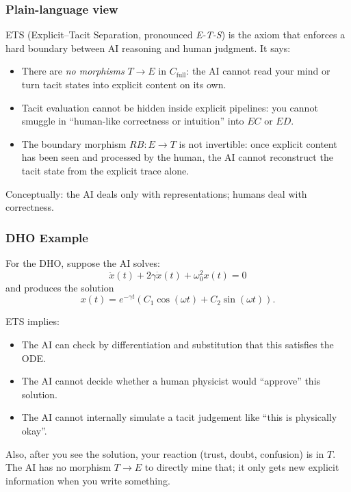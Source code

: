 \subsubsection*{Plain-language view}

ETS (Explicit--Tacit Separation, pronounced \emph{E-T-S}) is the axiom that enforces a hard boundary
between AI reasoning and human judgment. It says:

\begin{itemize}
 \item There are \emph{no morphisms} $T \to E$ in $C_{\text{full}}$:
 the AI cannot read your mind or turn tacit states into explicit content on its own.
 \item Tacit evaluation cannot be hidden inside explicit pipelines:
 you cannot smuggle in ``human-like correctness or intuition'' into $EC$ or $ED$.
 \item The boundary morphism $RB : E \to T$ is not invertible:
 once explicit content has been seen and processed by the human, the AI cannot reconstruct
 the tacit state from the explicit trace alone.
\end{itemize}

Conceptually: the AI deals only with representations; humans deal with correctness.

\subsubsection*{DHO Example}

For the DHO, suppose the AI solves:
\[
\ddot{x}(t) + 2\gamma \dot{x}(t) + \omega_0^2 x(t) = 0
\]
and produces the solution
\[
x(t) = e^{-\gamma t}(C_1 \cos(\omega t) + C_2 \sin(\omega t)).
\]

ETS implies:

\begin{itemize}
 \item The AI can check by differentiation and substitution that this satisfies the ODE.
 \item The AI cannot decide whether a human physicist would ``approve'' this solution.
 \item The AI cannot internally simulate a tacit judgement like ``this is physically okay''.
\end{itemize}

Also, after you see the solution, your reaction (trust, doubt, confusion) is in $T$. 
The AI has no morphism $T \to E$ to directly mine that; it only gets new explicit information when
you write something.

